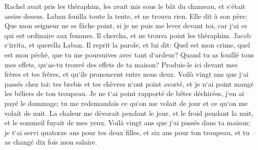 \verse Rachel avait pris les théraphim, les avait mis sous le bât du chameau, et s`était assise dessus. Laban fouilla toute la tente, et ne trouva rien. 
\verse Elle dit à son père: Que mon seigneur ne se fâche point, si je ne puis me lever devant toi, car j`ai ce qui est ordinaire aux femmes. Il chercha, et ne trouva point les théraphim. 
\verse Jacob s`irrita, et querella Laban. Il reprit la parole, et lui dit: Quel est mon crime, quel est mon péché, que tu me poursuives avec tant d`ardeur? 
\verse Quand tu as fouillé tous mes effets, qu`as-tu trouvé des effets de ta maison? Produis-le ici devant mes frères et tes frères, et qu`ils prononcent entre nous deux. 
\verse Voilà vingt ans que j`ai passés chez toi; tes brebis et tes chèvres n`ont point avorté, et je n`ai point mangé les béliers de ton troupeau. 
\verse Je ne t`ai point rapporté de bêtes déchirées, j`en ai payé le dommage; tu me redemandais ce qu`on me volait de jour et ce qu`on me volait de nuit. 
\verse La chaleur me dévorait pendant le jour, et le froid pendant la nuit, et le sommeil fuyait de mes yeux. 
\verse Voilà vingt ans que j`ai passés dans ta maison; je t`ai servi quatorze ans pour tes deux filles, et six ans pour ton troupeau, et tu as changé dix fois mon salaire. 
